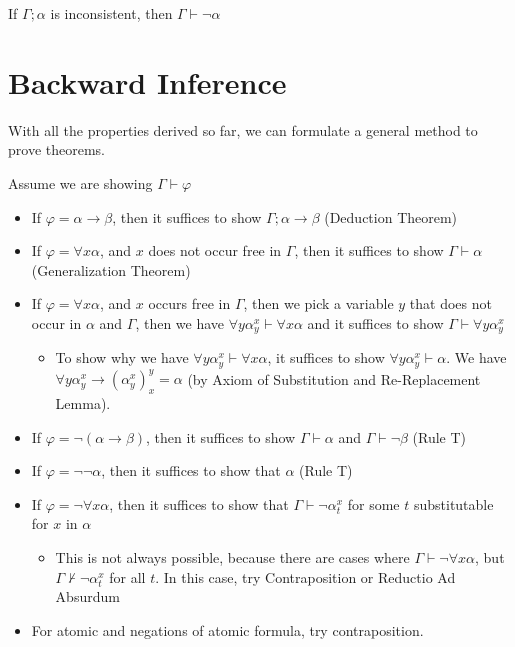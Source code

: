 \begin{itemize}
\begin{itemize}
    \end{itemize}
\end{itemize}

\begin{theorem}
    \label{thm:ReductioAdAbsurdum}
    If $\Gamma;\alpha$ is inconsistent, then $\Gamma\vdash\neg\alpha$
\end{theorem}

\section{Backward Inference}

With all the properties derived so far, we can formulate a general method to prove theorems.

Assume we are showing $\Gamma\vdash\varphi$

\begin{itemize}
    \item If $\varphi = \alpha\to\beta$, then it suffices to show $\Gamma;\alpha\to\beta$ (Deduction Theorem)
    \item If $\varphi = \forall x \alpha$, and $x$ does not occur free in $\Gamma$, then it suffices to show $\Gamma\vdash\alpha$ (Generalization Theorem)
    \item If $\varphi = \forall x\alpha$, and $x$ occurs free in $\Gamma$, then we pick a variable $y$ that does not occur in $\alpha$ and $\Gamma$, then we have $\forall y \alpha_y^x\vdash\forall x\alpha$ and it suffices to show $\Gamma\vdash\forall y \alpha_y^x$
    \begin{itemize}
        \item To show why we have $\forall y \alpha_y^x\vdash\forall x\alpha$, it suffices to show $\forall y \alpha_y^x\vdash\alpha$. We have $\forall y \alpha_y^x \to \left( \alpha_y^x \right)_x^y = \alpha$ (by Axiom of Substitution and Re-Replacement Lemma).
    \end{itemize}
    \item If $\varphi = \neg\left( \alpha\to\beta \right)$, then it suffices to show $\Gamma\vdash\alpha$ and $\Gamma\vdash\neg\beta$ (Rule T)
    \item If $\varphi=\neg\neg\alpha$, then it suffices to show that $\alpha$ (Rule T)
    \item If $\varphi=\neg\forall x \alpha$, then it suffices to show that $\Gamma\vdash\neg\alpha_t^x$ for some $t$ substitutable for $x$ in $\alpha$
    \begin{itemize}
        \item This is not always possible, because there are cases where $\Gamma\vdash\neg\forall x\alpha$, but $\Gamma\nvdash\neg\alpha_t^x$ for all $t$. In this case, try Contraposition or Reductio Ad Absurdum
    \end{itemize}
    \item For atomic and negations of atomic formula, try contraposition.
\end{itemize}

